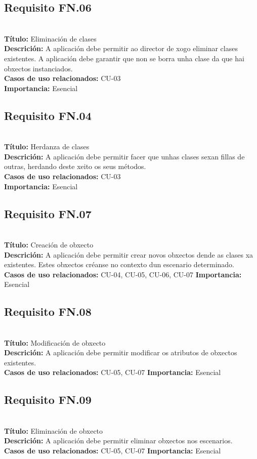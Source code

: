 \subsection{Requisito FN.06}~\\
{\bf Título:} Eliminación de clases\\
{\bf Descrición:} A aplicación debe permitir ao director de xogo eliminar clases
existentes. A aplicación debe garantir que non se borra unha clase da que hai
obxectos instanciados.\\
{\bf Casos de uso relacionados:} CU-03\\
{\bf Importancia:} Esencial

\subsection{Requisito FN.04}~\\
{\bf Título:} Herdanza de clases\\
{\bf Descrición:} A aplicación debe permitir facer que unhas clases sexan
fillas de outras, herdando deste xeito os seus métodos.\\
{\bf Casos de uso relacionados:} CU-03\\
{\bf Importancia:} Esencial

\subsection{Requisito FN.07}~\\
{\bf Título:} Creación de obxecto\\
{\bf Descrición:} A aplicación debe permitir crear novos obxectos dende as
clases xa existentes. Estes obxectos créanse no contexto dun escenario
determinado.\\
{\bf Casos de uso relacionados:} CU-04, CU-05, CU-06, CU-07
{\bf Importancia:} Esencial

\subsection{Requisito FN.08}~\\
{\bf Título:} Modificación de obxecto\\
{\bf Descrición:} A aplicación debe permitir modificar os atributos de obxectos existentes.\\
{\bf Casos de uso relacionados:} CU-05, CU-07
{\bf Importancia:} Esencial

\subsection{Requisito FN.09}~\\
{\bf Título:} Eliminación de obxecto\\
{\bf Descrición:} A aplicación debe permitir eliminar obxectos nos escenarios.\\
{\bf Casos de uso relacionados:} CU-05, CU-07
{\bf Importancia:} Esencial

